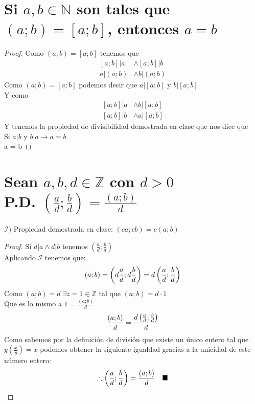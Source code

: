 \documentclass[12pt]{article}
\begin{document}
    \section{Si $a,b \in \mathbb{N}$ son tales que $(a;b)=[a;b]$, entonces $a=b$}
        \begin{proof}
            Como $(a;b)=[a;b]$ tenemos que \\
            \begin{align}
                \tag{Por definición de mcd} [a;b]|a &\wedge [a;b]|b\\
                \tag{Por definición de mcm} a|(a;b) &\wedge b|(a;b)
            \end{align}
            Como $(a;b)=[a;b]$ podemos decir que $a|[a;b]$ y $b|[a;b]$ \\
            Y como
            \begin{align}
                \tag{Por transitividad $b|a$} [a;b]|a &\wedge b|[a;b] \\
                \tag{Por transitividad $a|b$} [a;b]|b &\wedge a|[a;b]
            \end{align}
            Y tenemos la propiedad de divisibilidad demostrada en clase que nos dice que \\
            Si $a|b$ y $b|a \rightarrow a=b$ \\
            \therefore a = b \quad \blacksquare
        \end{proof}
    \section{Sean $a,b,d \in \mathbb{Z}$ con $d > 0$ \\ P.D. $\left( \frac{a}{d};\frac{b}{d} \right) = \frac{(a;b)}{d}$}
        $\mathcal{I)}$ Propiedad demostrada en clase: $(ca;cb)=c(a;b)$
        \begin{proof}
            Si $d|a \wedge d|b$ tenemos $\left( \frac{a}{d};\frac{b}{d} \right)$ \\
            Aplicando $\mathcal{I}$ tenemos que:
            \begin{align}
                \notag (a;b) = \left( d \frac{a}{d} ; d \frac{b}{d} \right) = d \left( \frac{a}{d} ; \frac{b}{d} \right)
            \end{align}
            Como $(a;b)=d \; \exists z = 1 \in \mathbb{Z}$ tal que $(a;b) = d \cdot 1$ \\
            Que es lo mismo a $1=\frac{(a;b)}{d}$
            \begin{align}
                \notag \frac{(a;b)}{d} = \frac{d \left( \frac{a}{d};\frac{b}{d} \right) }{d}
            \end{align}
            Como sabemos por la definición de división que existe un único entero tal que $ y  \left( \frac{x}{y} \right) = x $ podemos obtener la siguiente igualdad gracias a la unicidad de este número entero:
            \begin{align}
                \notag \therefore \left( \frac{a}{d};\frac{b}{d} \right) = \frac{(a;b)}{d} \quad \blacksquare
            \end{align}
        \end{proof}
\end{document}
